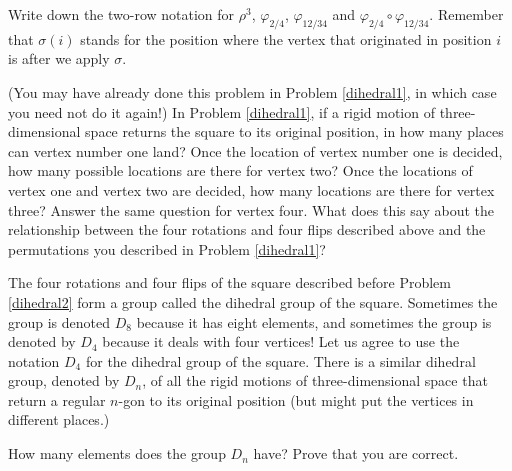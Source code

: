 \bp
\iteme Write down the two-row notation for $\rho^3$, $\varphi_{2/4}$,
$\varphi_{12/34}$ and $\varphi_{2/4}\circ \varphi_{12/34}$.  Remember that $\sigma(i)$
stands for the position where the vertex that originated in position $i$ is after we
apply $\sigma$.
\item (You may have already done this problem in Problem
\ref{dihedral1}, in which case you need not do it again!)  In Problem
\ref{dihedral1}, if a rigid motion of three-dimensional space returns the
square to its original position, in how many places can vertex number one
land?  Once the location of vertex number one is decided, how many
possible locations are there for vertex two?  Once the locations of
vertex one and vertex two are decided, how many locations are there for
vertex three?  Answer the same  question for vertex four.  What does this
say about the relationship between the four rotations and four flips
described above and the permutations you described in Problem
\ref{dihedral1}?\label{dihedral2}
\ep

The four rotations and four flips of the square described before Problem
\ref{dihedral2} form a group called the dihedral group of the square. 
Sometimes the group is denoted $D_8$ because it has eight elements, and
sometimes the group is denoted by $D_4$ because it deals with four
vertices!  Let us agree to use the notation $D_4$ for the dihedral group
of the square.  There is a similar dihedral group, denoted by $D_{n}$, of
all the rigid motions of three-dimensional space that return a regular
$n$-gon to its original position (but might put the vertices in different
places.) 

\bp
\itemei How many elements does the group $D_n$ have? Prove that you are
correct.
\ep

